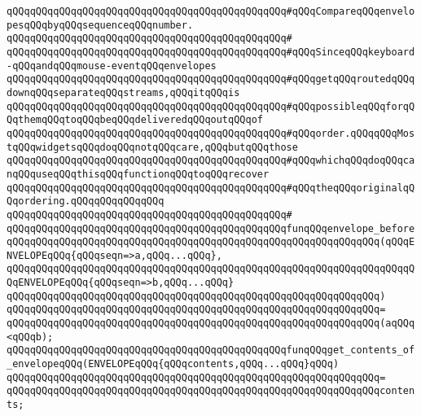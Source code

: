 \verb|qQQqqQQqqQQqqQQqqQQqqQQqqQQqqQQqqQQqqQQqqQQqqQQq#qQQqCompareqQQqenvelopesqQQqbyqQQqsequenceqQQqnumber.|\newline
\verb|qQQqqQQqqQQqqQQqqQQqqQQqqQQqqQQqqQQqqQQqqQQqqQQq#|\newline
\verb|qQQqqQQqqQQqqQQqqQQqqQQqqQQqqQQqqQQqqQQqqQQqqQQq#qQQqSinceqQQqkeyboard-qQQqandqQQqmouse-eventqQQqenvelopes|\newline
\verb|qQQqqQQqqQQqqQQqqQQqqQQqqQQqqQQqqQQqqQQqqQQqqQQq#qQQqgetqQQqroutedqQQqdownqQQqseparateqQQqstreams,qQQqitqQQqis|\newline
\verb|qQQqqQQqqQQqqQQqqQQqqQQqqQQqqQQqqQQqqQQqqQQqqQQq#qQQqpossibleqQQqforqQQqthemqQQqtoqQQqbeqQQqdeliveredqQQqoutqQQqof|\newline
\verb|qQQqqQQqqQQqqQQqqQQqqQQqqQQqqQQqqQQqqQQqqQQqqQQq#qQQqorder.qQQqqQQqMostqQQqwidgetsqQQqdoqQQqnotqQQqcare,qQQqbutqQQqthose|\newline
\verb|qQQqqQQqqQQqqQQqqQQqqQQqqQQqqQQqqQQqqQQqqQQqqQQq#qQQqwhichqQQqdoqQQqcanqQQquseqQQqthisqQQqfunctionqQQqtoqQQqrecover|\newline
\verb|qQQqqQQqqQQqqQQqqQQqqQQqqQQqqQQqqQQqqQQqqQQqqQQq#qQQqtheqQQqoriginalqQQqordering.qQQqqQQqqQQqqQQq|\newline
\verb|qQQqqQQqqQQqqQQqqQQqqQQqqQQqqQQqqQQqqQQqqQQqqQQq#|\newline
\verb|qQQqqQQqqQQqqQQqqQQqqQQqqQQqqQQqqQQqqQQqqQQqqQQqfunqQQqenvelope_before|\newline
\verb|qQQqqQQqqQQqqQQqqQQqqQQqqQQqqQQqqQQqqQQqqQQqqQQqqQQqqQQqqQQqqQQq(qQQqENVELOPEqQQq{qQQqseqn=>a,qQQq...qQQq},|\newline
\verb|qQQqqQQqqQQqqQQqqQQqqQQqqQQqqQQqqQQqqQQqqQQqqQQqqQQqqQQqqQQqqQQqqQQqqQQqENVELOPEqQQq{qQQqseqn=>b,qQQq...qQQq}|\newline
\verb|qQQqqQQqqQQqqQQqqQQqqQQqqQQqqQQqqQQqqQQqqQQqqQQqqQQqqQQqqQQqqQQq)|\newline
\verb|qQQqqQQqqQQqqQQqqQQqqQQqqQQqqQQqqQQqqQQqqQQqqQQqqQQqqQQqqQQqqQQq=|\newline
\verb|qQQqqQQqqQQqqQQqqQQqqQQqqQQqqQQqqQQqqQQqqQQqqQQqqQQqqQQqqQQqqQQq(aqQQq<qQQqb);|\newline
\newline
\verb|qQQqqQQqqQQqqQQqqQQqqQQqqQQqqQQqqQQqqQQqqQQqqQQqfunqQQqget_contents_of_envelopeqQQq(ENVELOPEqQQq{qQQqcontents,qQQq...qQQq}qQQq)|\newline
\verb|qQQqqQQqqQQqqQQqqQQqqQQqqQQqqQQqqQQqqQQqqQQqqQQqqQQqqQQqqQQqqQQq=|\newline
\verb|qQQqqQQqqQQqqQQqqQQqqQQqqQQqqQQqqQQqqQQqqQQqqQQqqQQqqQQqqQQqqQQqcontents;|\newline
